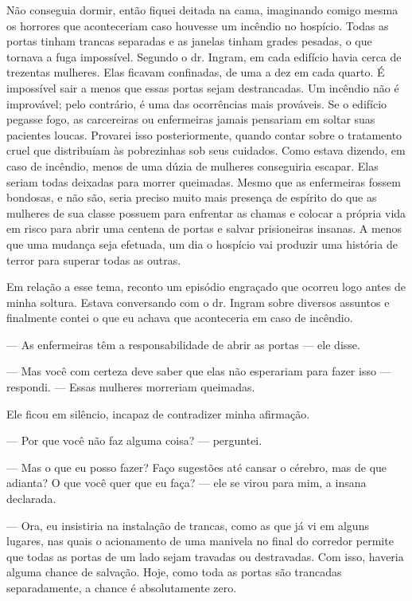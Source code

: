 Não conseguia dormir, então fiquei deitada na cama, imaginando comigo
mesma os horrores que aconteceriam caso houvesse um incêndio no
hospício. Todas as portas tinham trancas separadas e as janelas tinham
grades pesadas, o que tornava a fuga impossível. Segundo o dr. Ingram,
em cada edifício havia cerca de trezentas mulheres. Elas ficavam
confinadas, de uma a dez em cada quarto. É impossível sair a menos que
essas portas sejam destrancadas. Um incêndio não é improvável; pelo
contrário, é uma das ocorrências mais prováveis. Se o edifício pegasse
fogo, as carcereiras ou enfermeiras jamais pensariam em soltar suas
pacientes loucas. Provarei isso posteriormente, quando contar sobre o
tratamento cruel que distribuíam às pobrezinhas sob seus cuidados. Como
estava dizendo, em caso de incêndio, menos de uma dúzia de mulheres
conseguiria escapar. Elas seriam todas deixadas para morrer queimadas.
Mesmo que as enfermeiras fossem bondosas, e não são, seria preciso muito
mais presença de espírito do que as mulheres de sua classe possuem para
enfrentar as chamas e colocar a própria vida em risco para abrir uma
centena de portas e salvar prisioneiras insanas. A menos que uma mudança
seja efetuada, um dia o hospício vai produzir uma história de terror
para superar todas as outras.

Em relação a esse tema, reconto um episódio engraçado que ocorreu logo
antes de minha soltura. Estava conversando com o dr. Ingram sobre
diversos assuntos e finalmente contei o que eu achava que aconteceria em
caso de incêndio.

--- As enfermeiras têm a responsabilidade de abrir as portas --- ele
disse.

--- Mas você com certeza deve saber que elas não esperariam para fazer
isso --- respondi. --- Essas mulheres morreriam queimadas.

Ele ficou em silêncio, incapaz de contradizer minha afirmação.

--- Por que você não faz alguma coisa? --- perguntei.

--- Mas o que eu posso fazer? Faço sugestões até cansar o cérebro, mas
de que adianta? O que você quer que eu faça? --- ele se virou para mim,
a insana declarada.

--- Ora, eu insistiria na instalação de trancas, como as que já vi em
alguns lugares, nas quais o acionamento de uma manivela no final do
corredor permite que todas as portas de um lado sejam travadas ou
destravadas. Com isso, haveria alguma chance de salvação. Hoje, como
toda as portas são trancadas separadamente, a chance é absolutamente
zero.

